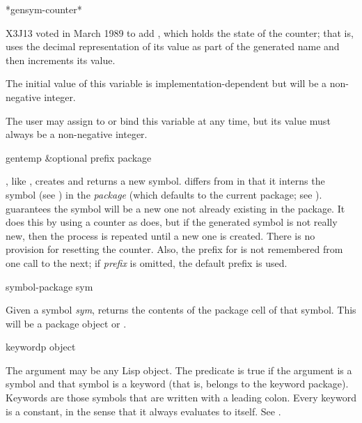 \begin{newer}
\begin{defun}[Variable]
*gensym-counter*

X3J13 voted in March 1989 
to add , which
holds the state of the  counter; that is, 
uses the decimal representation of its value as part of the generated name
and then increments its value.

The initial value of this variable is implementation-dependent
but will be a non-negative integer.

The user may assign to or bind this variable at any time, but its value
must always be a non-negative integer.
\end{defun}
\end{newer}

\begin{defun}[Function]
gentemp &optional prefix package

, like , creates and returns a new symbol.
 differs from  in that it interns the symbol
(see ) in the \emph{package} (which defaults to the current
package; see ).   guarantees the symbol
will be a new one not already existing in the package.  It does this
by using a counter as  does, but if the generated symbol
is not really new, then the process is repeated until a new one is created.
There is no provision for resetting the  counter.
Also, the prefix for  is not remembered from one call
to the next; if \emph{prefix} is omitted, the default prefix  is used.
\end{defun}

\begin{defun}[Function]
symbol-package sym

Given a symbol \emph{sym},  returns the contents of the
package cell of that symbol.  This will be a package object or {\nil}.
\end{defun}

\begin{defun}[Function]
keywordp object

The argument may be any Lisp object.  The predicate  is true
if the argument is a symbol and that
symbol is a keyword (that is, belongs to the keyword
package).  Keywords are those symbols that are written with
a leading colon.  Every keyword is a constant, in the sense
that it always evaluates to itself.  See .
\end{defun}


